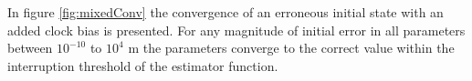 In figure \ref{fig:mixedConv} the convergence of an erroneous initial state with an added clock bias is presented. For any magnitude of initial error in all parameters between $10^{-10}$ to $10^4$ m the parameters converge to the correct value within the interruption threshold of the estimator function.

